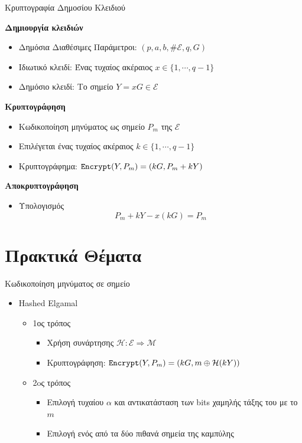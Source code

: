 \documentclass[handout]{beamer}
\begin{document}
\begin{frame}{Κρυπτογραφία Δημοσίου Κλειδιού}

\textbf{Δημιουργία κλειδιών }
\begin{itemize}
\item Δημόσια Διαθέσιμες Παράμετροι: $(p,a,b,\# \mathcal E,q,G)$ \pause
\item Ιδιωτικό κλειδί: Ένας τυχαίος ακέραιος $x \in \{1, \cdots, q-1 \}$ \pause
\item Δημόσιο κλειδί: Το σημείο $Y=xG \in \mathcal{E}$ \pause
\end{itemize}

\textbf{Κρυπτογράφηση}
\begin{itemize}
\item Κωδικοποίηση μηνύματος ως σημείο $P_m$ της $\mathcal{E}$ \pause
\item Επιλέγεται ένας τυχαίος ακέραιος $k \in \{1, \cdots, q-1 \}$ \pause
\item Κρυπτογράφημα: $\mathtt{Encrypt}(Y,P_m) = (kG,P_m+kY)$ \pause
\end{itemize}

\textbf{Αποκρυπτογράφηση}
\begin{itemize}
\item Υπολογισμός \[P_m+kY-x(kG)=P_m\] 
\end{itemize}

\end{frame}

\section{Πρακτικά Θέματα}

\begin{frame}{Κωδικοποίηση μηνύματος σε σημείο}
\begin{itemize}
\item Hashed Elgamal
\begin{itemize}
\item 1ος τρόπος
\begin{itemize}
\item Χρήση συνάρτησης $\mathcal{H}: \mathcal{E} \Rightarrow \mathcal{M}$
\item Κρυπτογράφηση: $\mathtt{Encrypt}(Y,P_m) = (kG, m\oplus \mathcal{H}(kY))$
\end{itemize}
\item 2oς τρόπος
\begin{itemize}
\item Επιλογή τυχαίου $\alpha$ και αντικατάσταση των bits χαμηλής τάξης του με το $m$
\item Επιλογή ενός από τα δύο πιθανά σημεία της καμπύλης
\end{itemize}
\end{itemize}
\end{itemize}
\end{frame}
\end{document}
